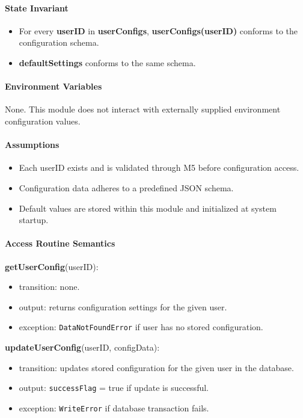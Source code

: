 \documentclass[12pt, titlepage]{article}
\begin{document}
\paragraph{State Invariant}
\begin{itemize}
  \item For every \textbf{userID} in \textbf{userConfigs}, \textbf{userConfigs(userID)} conforms to the configuration schema.
  \item \textbf{defaultSettings} conforms to the same schema.
\end{itemize}

\paragraph{Environment Variables}
None. This module does not interact with externally supplied
environment configuration values.

\paragraph{Assumptions}
\begin{itemize}
  \item Each userID exists and is validated through M5 before configuration access.
  \item Configuration data adheres to a predefined JSON schema.
  \item Default values are stored within this module and initialized at system startup.
\end{itemize}

\paragraph{Access Routine Semantics}

\noindent \textbf{getUserConfig}(userID):
\begin{itemize}
  \item transition: none.
  \item output: returns configuration settings for the given user.
  \item exception: \texttt{DataNotFoundError} if user has no stored configuration.
\end{itemize}

\noindent \textbf{updateUserConfig}(userID, configData):
\begin{itemize}
  \item transition: updates stored configuration for the given user in the database.
  \item output: \texttt{successFlag} = true if update is successful.
  \item exception: \texttt{WriteError} if database transaction fails.
\end{itemize}
\end{document}
